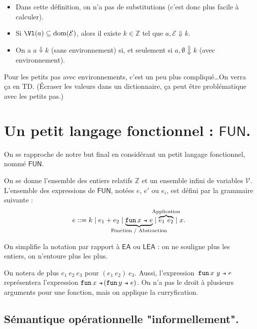 \documentclass[../main]{subfiles}
\begin{document}
  \begin{rmk}
    \begin{itemize}
      \item Dans cette définition, on n'a pas de substitutions (c'est donc plus facile à calculer).
      \item Si $\Vl(a) \subseteq \mathrm{dom}(\mathcal{E})$, alors il existe $k \in \mathds{Z}$ tel que $a, \mathcal{E} \Downarrow k$.
      \item On a $a\Downarrow k$ (sans environnement) si, et seulement si $a, \emptyset \Downarrow k$ (avec environnement).
    \end{itemize}
  \end{rmk}

  Pour les petits pas avec environnements, c'est un peu plus compliqué\ldots On verra ça en TD. (Écraser les valeurs dans un dictionnaire, ça peut être problématique avec les petits pas.)

  \section{Un petit langage fonctionnel : $\mathsf{FUN}$.}
  
  On se rapproche de notre but final en considérant un petit langage fonctionnel, nommé $\mathsf{FUN}$.

  On se donne l'ensemble des entiers relatifs $\mathds{Z}$ et un ensemble infini de variables $\mathcal{V}$.
  L'ensemble des expressions de $\mathsf{FUN}$, notées $e$, $e'$ ou $e_i$,  est défini 
  par la grammaire suivante :
  \[
    e ::= k  \mid e_1 + e_2  \mid \underbrace{\fun x e}_{\mathclap{\text{Fonction / Abstraction}}} \mid \overbrace{e_1\ e_2}^{\mathclap{\text{Application}}}  \mid x
  .\]

  \begin{note}
    On simplifie la notation par rapport à $\mathsf{EA}$ ou $\mathsf{LEA}$ : on ne souligne plus les entiers, on n'entoure plus les plus.

    On notera de plus $e_1\ e_2\ e_3$ pour $(e_1\ e_2)\ e_3$.
    Aussi, l'expression~$\fun {x\ y} e$ représentera l'expression $\fun x (\fun y e)$.
    On n'a pas le droit à plusieurs arguments pour une fonction, mais on applique la curryfication.
  \end{note}

  \subsection{Sémantique opérationnelle "informellement".}
\end{document}
